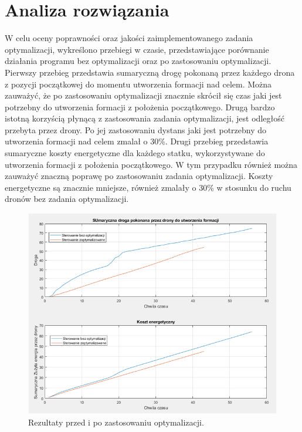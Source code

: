 \documentclass[a4paper, 11pt, oneside]{article}
\begin{document}
\newpage
\section{Analiza rozwiązania}
W celu oceny poprawności oraz jakości zaimplementowanego zadania optymalizacji, wykreślono przebiegi w czasie, przedstawiające porównanie działania programu bez optymalizacji oraz po zastosowaniu optymalizacji. Pierwszy przebieg przedstawia sumaryczną drogę pokonaną przez każdego drona z pozycji początkowej do momentu utworzenia formacji nad celem. Można zauważyć, że po zastosowaniu optymalizacji znacznie skrócił się czas jaki jest potrzebny do utworzenia formacji z położenia początkowego. Drugą bardzo istotną korzyścią płynącą z zastosowania zadania optymalizacji, jest odległość przebyta przez drony. Po jej zastosowaniu dystans jaki jest potrzebny do utworzenia formacji nad celem zmalał o 30\%. 
\newline
Drugi przebieg przedstawia sumaryczne koszty energetyczne dla każdego statku, wykorzystywane  do utworzenia formacji z położenia początkowego. W tym przypadku również można zauważyć znaczną poprawę po zastosowaniu zadania optymalizacji. Koszty energetyczne są znacznie mniejsze, również zmalały o 30\% w stosunku do ruchu dronów bez zadania optymalizacji.   
\begin{figure}[H]
\centering
\includegraphics[scale=0.8]{porownanie.png}
\caption{Rezultaty przed i po zastosowaniu optymalizacji.}
\end{figure}


\newpage
\end{document}
